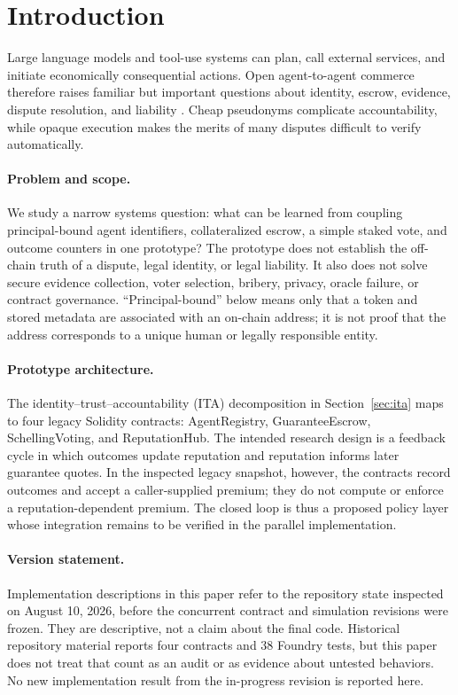 \section{Introduction}
\label{sec:intro}

Large language models and tool-use systems can plan, call external services, and initiate
economically consequential actions. Open agent-to-agent commerce therefore raises familiar but
important questions about identity, escrow, evidence, dispute resolution, and liability
\cite{a2a-finance,agent-rep}. Cheap pseudonyms complicate accountability, while opaque execution
makes the merits of many disputes difficult to verify automatically.

\paragraph{Problem and scope.}
We study a narrow systems question: what can be learned from coupling principal-bound agent
identifiers, collateralized escrow, a simple staked vote, and outcome counters in one prototype? The
prototype does not establish the off-chain truth of a dispute, legal identity, or legal liability. It
also does not solve secure evidence collection, voter selection, bribery, privacy, oracle failure, or
contract governance. ``Principal-bound'' below means only that a token and stored metadata are
associated with an on-chain address; it is not proof that the address corresponds to a unique human
or legally responsible entity.

\paragraph{Prototype architecture.}
The identity--trust--accountability (ITA) decomposition in Section~\ref{sec:ita} maps to four legacy
Solidity contracts: \textsf{AgentRegistry}, \textsf{GuaranteeEscrow},
\textsf{SchellingVoting}, and \textsf{ReputationHub}. The intended research design is a feedback
cycle in which outcomes update reputation and reputation informs later guarantee quotes. In the
inspected legacy snapshot, however, the contracts record outcomes and accept a caller-supplied
premium; they do not compute or enforce a reputation-dependent premium. The closed loop is thus a
proposed policy layer whose integration remains to be verified in the parallel implementation.

\paragraph{Version statement.}
Implementation descriptions in this paper refer to the repository state inspected on August 10,
2026, before the concurrent contract and simulation revisions were frozen. They are descriptive, not
a claim about the final code. Historical repository material reports four contracts and 38 Foundry
tests, but this paper does not treat that count as an audit or as evidence about untested behaviors.
No new implementation result from the in-progress revision is reported here.

